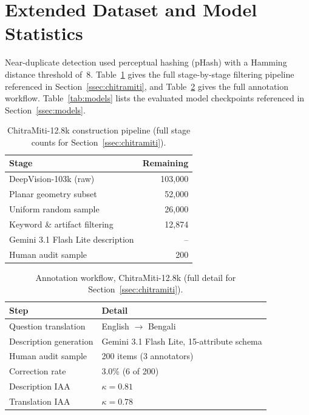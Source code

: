 \documentclass[11pt]{article}
\begin{document}
\section{Extended Dataset and Model Statistics}
\label{app:extended_stats}

Near-duplicate detection used perceptual hashing (pHash) with a Hamming distance threshold of~8. Table~\ref{tab:pipeline} gives the full stage-by-stage filtering pipeline referenced in Section~\ref{ssec:chitramiti}, and Table~\ref{tab:annotation} gives the full annotation workflow. Table~\ref{tab:models} lists the evaluated model checkpoints referenced in Section~\ref{ssec:models}.

\begin{table}[t]
\centering\small
\begin{tabular}{lr}
\toprule
Stage & Remaining \\
\midrule
DeepVision-103k (raw) & 103,000 \\
Planar geometry subset & 52,000 \\
Uniform random sample & 26,000 \\
Keyword \& artifact filtering & 12,874 \\
Gemini 3.1 Flash Lite description & -- \\
Human audit sample & 200 \\
\bottomrule
\end{tabular}
\caption{ChitraMiti-12.8k construction pipeline (full stage counts for Section~\ref{ssec:chitramiti}).}
\label{tab:pipeline}
\end{table}

\begin{table}[t]
\centering\small
\begin{tabular}{l p{3.2cm}}
\toprule
Step & Detail \\
\midrule
Question translation & English $\to$ Bengali \\
Description generation & Gemini 3.1 Flash Lite, 15-attribute schema \\
Human audit sample & 200 items (3 annotators) \\
Correction rate & 3.0\% (6 of 200) \\
Description IAA & $\kappa = 0.81$ \\
Translation IAA & $\kappa = 0.78$ \\
\bottomrule
\end{tabular}
\caption{Annotation workflow, ChitraMiti-12.8k (full detail for Section~\ref{ssec:chitramiti}).}
\label{tab:annotation}
\end{table}
\end{document}

